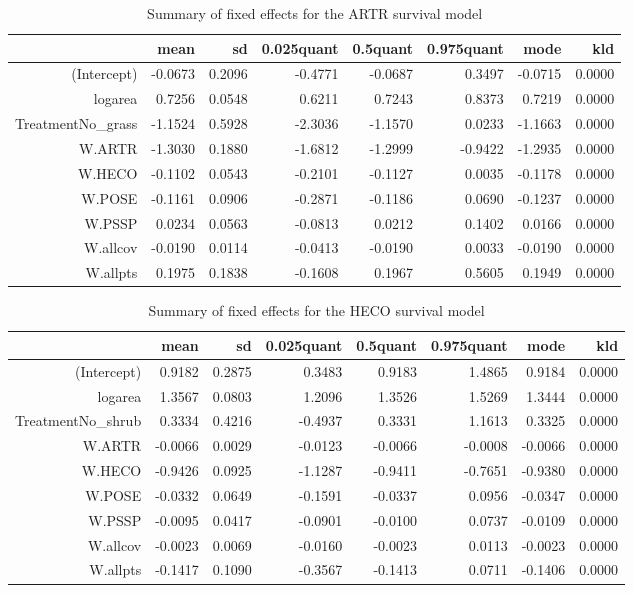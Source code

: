 \begin{table}[ht]
\centering
\caption{Summary of fixed effects for the ARTR survival model} 
\label{ARTRsurvival}
\begin{tabular}{rrrrrrrr}
  \hline
 & mean & sd & 0.025quant & 0.5quant & 0.975quant & mode & kld \\ 
  \hline
(Intercept) & -0.0673 & 0.2096 & -0.4771 & -0.0687 & 0.3497 & -0.0715 & 0.0000 \\ 
  logarea & 0.7256 & 0.0548 & 0.6211 & 0.7243 & 0.8373 & 0.7219 & 0.0000 \\ 
  TreatmentNo\_grass & -1.1524 & 0.5928 & -2.3036 & -1.1570 & 0.0233 & -1.1663 & 0.0000 \\ 
  W.ARTR & -1.3030 & 0.1880 & -1.6812 & -1.2999 & -0.9422 & -1.2935 & 0.0000 \\ 
  W.HECO & -0.1102 & 0.0543 & -0.2101 & -0.1127 & 0.0035 & -0.1178 & 0.0000 \\ 
  W.POSE & -0.1161 & 0.0906 & -0.2871 & -0.1186 & 0.0690 & -0.1237 & 0.0000 \\ 
  W.PSSP & 0.0234 & 0.0563 & -0.0813 & 0.0212 & 0.1402 & 0.0166 & 0.0000 \\ 
  W.allcov & -0.0190 & 0.0114 & -0.0413 & -0.0190 & 0.0033 & -0.0190 & 0.0000 \\ 
  W.allpts & 0.1975 & 0.1838 & -0.1608 & 0.1967 & 0.5605 & 0.1949 & 0.0000 \\ 
   \hline
\end{tabular}
\end{table}

\begin{table}[ht]
\centering
\caption{Summary of fixed effects for the HECO survival model} 
\label{HECOsurvival}
\begin{tabular}{rrrrrrrr}
  \hline
 & mean & sd & 0.025quant & 0.5quant & 0.975quant & mode & kld \\ 
  \hline
(Intercept) & 0.9182 & 0.2875 & 0.3483 & 0.9183 & 1.4865 & 0.9184 & 0.0000 \\ 
  logarea & 1.3567 & 0.0803 & 1.2096 & 1.3526 & 1.5269 & 1.3444 & 0.0000 \\ 
  TreatmentNo\_shrub & 0.3334 & 0.4216 & -0.4937 & 0.3331 & 1.1613 & 0.3325 & 0.0000 \\ 
  W.ARTR & -0.0066 & 0.0029 & -0.0123 & -0.0066 & -0.0008 & -0.0066 & 0.0000 \\ 
  W.HECO & -0.9426 & 0.0925 & -1.1287 & -0.9411 & -0.7651 & -0.9380 & 0.0000 \\ 
  W.POSE & -0.0332 & 0.0649 & -0.1591 & -0.0337 & 0.0956 & -0.0347 & 0.0000 \\ 
  W.PSSP & -0.0095 & 0.0417 & -0.0901 & -0.0100 & 0.0737 & -0.0109 & 0.0000 \\ 
  W.allcov & -0.0023 & 0.0069 & -0.0160 & -0.0023 & 0.0113 & -0.0023 & 0.0000 \\ 
  W.allpts & -0.1417 & 0.1090 & -0.3567 & -0.1413 & 0.0711 & -0.1406 & 0.0000 \\ 
   \hline
\end{tabular}
\end{table}

